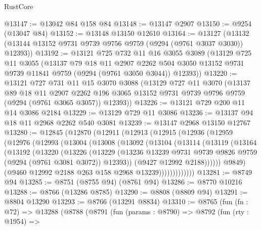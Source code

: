 \begin{lexlean}{RustCore}
\begin{coremodule}
@13147 := @13042 @84 @158 @84
@13148 := @13147 @2907
@13150 := @9254 (@13047 @84)
@13152 := @13148 @13150 @12610
@13164 := @13127 (@13132 (@13144 @13152 @9731 @9739 @9756 @9759 (@9294 (@9761 @3037 @3030)) @12393))
@13192 := @13121
    @725
    @732
    @11
    @16
    @3055
    @3089
    (@13129
      @725
      @11
      @3055
      (@13137
        @79
        @18
        @11
        @2907
        @2262
        @504
        @3050
        @13152
        @9731
        @9739
        @11841
        @9759
        (@9294 (@9761 @3050 @3044))
        @12393))
@13220 := @13121
    @727
    @731
    @11
    @15
    @3070
    @3088
    (@13129
      @727
      @11
      @3070
      (@13137
        @89
        @18
        @11
        @2907
        @2262
        @196
        @3065
        @13152
        @9731
        @9739
        @9796
        @9759
        (@9294 (@9761 @3065 @3057))
        @12393))
@13226 := @13121 @729 @200 @11 @14 @3086 @2184
@13229 := @13129 @729 @11 @3086
@13236 := @13137 @94 @18 @11 @2968 @2262 @540 @3081
@13239 := @13147 @2968 @13150 @12767
@13280 := @12845
    (@12870
      (@12911
        (@12913
          (@12915
            (@12936
              (@12959
                (@12976
                  (@12993
                    (@13004
                      (@13008
                        (@13092
                          (@13104
                            (@13114
                              (@13119
                                (@13164
                                  (@13192
                                    (@13220
                                      (@13226
                                        (@13229
                                          (@13236
                                            @13239
                                            @9731
                                            @9739
                                            @9826
                                            @9759
                                            (@9294 (@9761 @3081 @3072))
                                            @12393))
                                        (@9427 @12992 @2188))))))
                              @9849)
                            (@9460 @12992 @2188 @263 @158 @2968 @13239)))))))))))))
@13281 := @8749 @94
@13285 := @8751 (@8755 @94) (@8761 @94)
@13286 := @8770 @10216
@13288 := @8766 (@13286 @8785)
@13290 := @8808 (@8809 @94)
@13291 := @8804 @13290
@13293 := @8766 (@13291 @8834)
@13310 := @8765
    (fun (fn : @72) =>
    @13288
      (@8788
        (@8791
          (fun (params : @8790) =>
          @8792
            (fun (rty : @1954) =>

\end{coremodule}
\end{lexlean}
